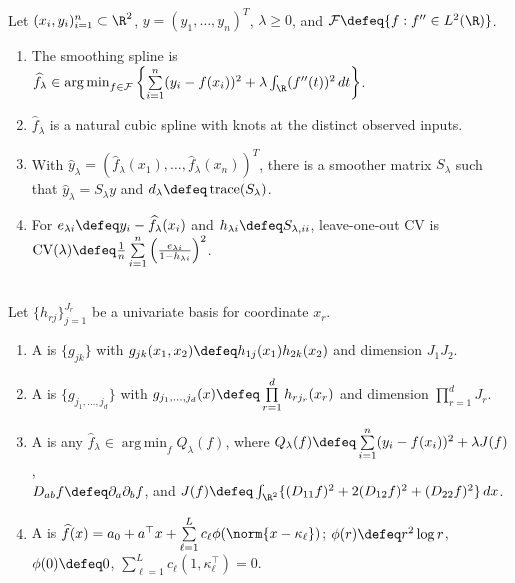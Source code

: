 \begin{method} \label{meth:sl-smoothing-spline-penalty} \\
Let $(x_i,y_i)_{i=1}^n\subset\R^2$, $y=(y_1,\ldots,y_n)^T$, $\lambda\ge0$, and $\mathcal{F}\defeq\{f:f''\in L^2(\R)\}$.
\begin{enumerate}[label=(\roman*)]
\setlength{\itemsep}{0pt}
\item The smoothing spline is $\widehat{f}_\lambda\in\operatorname*{arg\,min}_{f\in\mathcal{F}}\left\{\sum\limits_{i=1}^n(y_i-f(x_i))^2+\lambda\int_{\R}(f''(t))^2\,dt\right\}$.
\item $\widehat{f}_\lambda$ is a natural cubic spline with knots at the distinct observed inputs.
\item With $\widehat{y}_\lambda=(\widehat{f}_\lambda(x_1),\ldots,\widehat{f}_\lambda(x_n))^T$, there is a smoother matrix $S_\lambda$ such that $\widehat{y}_\lambda=S_\lambda y$ and $d_\lambda\defeq\operatorname{trace}(S_\lambda)$.
\item For $e_{\lambda i}\defeq y_i-\widehat{f}_\lambda(x_i)$ and $h_{\lambda i}\defeq S_{\lambda,ii}$, leave-one-out CV is $\operatorname{CV}(\lambda)\defeq\frac{1}{n}\sum\limits_{i=1}^n\left(\frac{e_{\lambda i}}{1-h_{\lambda i}}\right)^2$.
\end{enumerate}
\end{method}

\begin{definition} \label{def:sl-tensor-product-and-thin-plate-splines} \\
Let $\{h_{rj}\}_{j=1}^{J_r}$ be a univariate basis for coordinate $x_r$.
\begin{enumerate}[label=(\roman*)]
\setlength{\itemsep}{0pt}
\item A  is $\{g_{jk}\}$ with $g_{jk}(x_1,x_2)\defeq h_{1j}(x_1)h_{2k}(x_2)$ and dimension $J_1J_2$.
\item A  is $\{g_{j_1,\ldots,j_d}\}$ with $g_{j_1,\ldots,j_d}(x)\defeq\prod\limits_{r=1}^d h_{rj_r}(x_r)$ and dimension $\prod\limits_{r=1}^d J_r$.
\item A  is any $\widehat{f}_\lambda\in\operatorname*{arg\,min}_f Q_\lambda(f)$, where $Q_\lambda(f)\defeq\sum\limits_{i=1}^n(y_i-f(x_i))^2+\lambda J(f)$,\\
$D_{ab}f\defeq\partial_a\partial_b f$, and $J(f)\defeq\int_{\R^2}\{(D_{11}f)^2+2(D_{12}f)^2+(D_{22}f)^2\}\,dx$.
\item A  is $\widehat{f}(x)=a_0+a^\top x+\sum\limits_{\ell=1}^L c_\ell\phi(\norm{x-\kappa_\ell})$; $\phi(r)\defeq r^2\log r$, $\phi(0)\defeq0$, $\sum\limits_{\ell=1}^L c_\ell(1,\kappa_\ell^\top)=0$.
\end{enumerate}
\end{definition}

